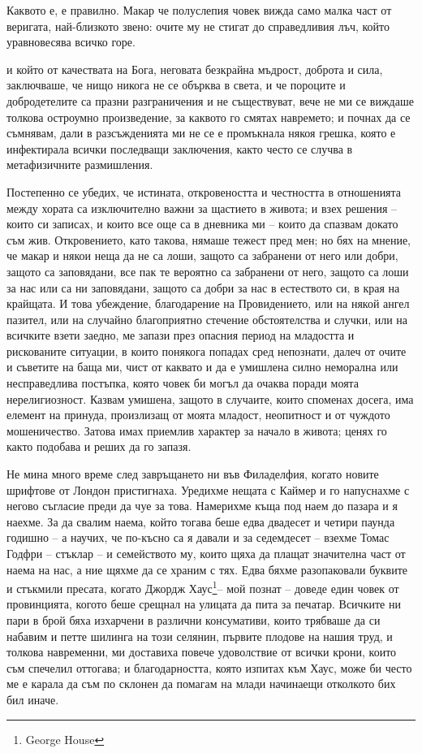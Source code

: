 \documentclass[12pt]{book}
\begin{document}
	Каквото е, е правилно. Макар че полуслепия човек
	вижда само малка част от веригата, най-близкото звено:
	очите му не стигат до справедливия лъч,
	който уравновесява всичко горе.

и който от качествата на Бога, неговата безкрайна мъдрост, доброта и сила, заключваше, че нищо никога не се обърква в света, и че пороците и добродетелите са празни разграничения и не съществуват, вече не ми се виждаше толкова остроумно произведение, за каквото го смятах навремето; и почнах да се съмнявам, дали в разсъжденията ми не се е промъкнала някоя грешка, която е инфектирала всички последващи заключения, както често се случва в метафизичните размишления.

Постепенно се убедих, че истината, откровеността и честността в отношенията между хората са изключително важни за щастието в живота; и взех решения – които си записах, и които все още са в дневника ми – които да спазвам докато съм жив. Откровението, като такова, нямаше тежест пред мен; но бях на мнение, че макар и някои неща да не са лоши, защото са забранени от него или добри, защото са заповядани, все пак те вероятно са забранени от него, защото са лоши за нас или са ни заповядани, защото са добри за нас в естеството си, в края на крайщата. И това убеждение, благодарение на Провидението, или на някой ангел пазител, или на случайно благоприятно стечение обстоятелства и случки, или на всичките взети заедно, ме запази през опасния период на младостта и рискованите ситуации, в които понякога попадах сред непознати, далеч от очите и съветите на баща ми, чист от каквато и да е умишлена силно неморална или несправедлива постъпка, която човек би могъл да очаква поради моята нерелигиозност. Казвам умишена, защото в случаите, които споменах досега, има елемент на принуда, произлизащ от моята младост, неопитност и от чуждото мошеничество. Затова имах приемлив характер за начало в живота; ценях го както подобава и реших да го запазя.

Не мина много време след завръщането ни във Филаделфия, когато новите шрифтове от Лондон пристигнаха. Уредихме нещата с Каймер и го напуснахме с негово съгласие преди да чуе за това. Намерихме къща под наем до пазара и я наехме. За да свалим наема, който тогава беше едва двадесет и четири паунда годишно – а научих, че по-късно са я давали и за седемдесет – взехме Томас Годфри – стъклар – и семейството му, които щяха да плащат значителна част от наема на нас, а ние щяхме да се храним с тях. Едва бяхме разопаковали буквите и стъкмили пресата, когато Джордж Хаус\footnote{George House}– мой познат – доведе един човек от провинцията, когото беше срещнал на улицата да пита за печатар. Всичките ни пари в брой бяха изхарчени в различни консумативи, които трябваше да си набавим и петте шилинга на този селянин, първите плодове на нашия труд, и толкова навременни, ми доставиха повече удоволствие от всички крони, които съм спечелил оттогава; и благодарността, която изпитах към Хаус, може би често ме е карала да съм по склонен да помагам на млади начинаещи отколкото бих бил иначе. 
\end{document}
